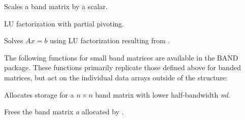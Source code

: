 \documentclass[letterpaper,10pt,english]{sphinxmanual}
\begin{document}

\begin{fulllineitems}
\label{linear_solvers/DLS:BandScale}
Scales a band matrix by a scalar.

\end{fulllineitems}


\begin{fulllineitems}
\label{linear_solvers/DLS:BandGBTRF}
LU factorization with partial pivoting.

\end{fulllineitems}


\begin{fulllineitems}
\label{linear_solvers/DLS:BandGBTRS}
Solves $Ax = b$ using LU factorization resulting from
{\hyperref[linear_solvers/DLS:BandGBTRF]{}}.

\end{fulllineitems}


The following functions for small band matrices are available in the
BAND package.  These functions primarily replicate those defined above
for {\hyperref[linear_solvers/DLS:DlsMat]{}} banded matrices, but act on the individual data arrays
outside of the {\hyperref[linear_solvers/DLS:DlsMat]{}} structure:

\begin{fulllineitems}
\label{linear_solvers/DLS:newBandMat}
Allocates storage for a $n \times n$ band matrix with lower
half-bandwidth \emph{ml}.

\end{fulllineitems}


\begin{fulllineitems}
Frees the band matrix \emph{a} allocated by {\hyperref[linear_solvers/DLS:newBandMat]{}}.

\end{fulllineitems}
\end{document}
